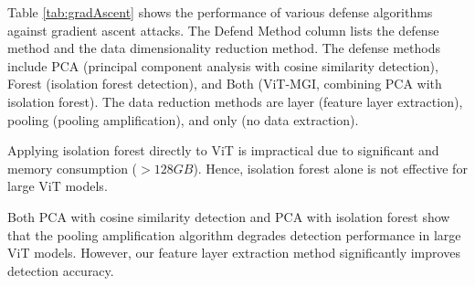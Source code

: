 \documentclass[conference]{IEEEtran}
\begin{document}



Table \hyperref[tab:gradAscent]{\ref{tab:gradAscent}} shows the performance of various defense algorithms against gradient ascent attacks. The Defend Method column lists the defense method and the data dimensionality reduction method. The defense methods include PCA (principal component analysis with cosine similarity detection), Forest (isolation forest detection), and Both (ViT-MGI, combining PCA with isolation forest). The data reduction methods are layer (feature layer extraction), pooling (pooling amplification), and only (no data extraction).

Applying isolation forest directly to ViT is impractical due to significant and memory consumption ($>128GB$). Hence, isolation forest alone is not effective for large ViT models.

Both PCA with cosine similarity detection and PCA with isolation forest show that the pooling amplification algorithm \cite{betterTogether} degrades detection performance in large ViT models. However, our feature layer extraction method significantly improves detection accuracy.
\end{document}
